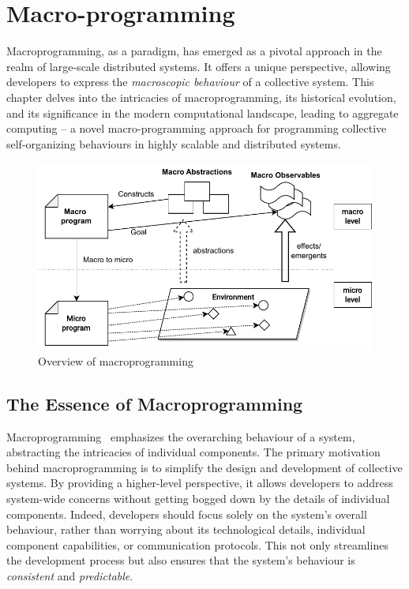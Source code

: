
\chapter{Macro-programming}\label{chap:macro-programming}%
\minitoc%
\newcommand{\q}[1]{\texttt{#1}}
Macroprogramming, as a paradigm, 
 has emerged as a pivotal approach in the realm of large-scale distributed systems. 
%
It offers a unique perspective, 
 allowing developers to express the \emph{macroscopic behaviour} of a collective system.
% 
This chapter delves into the intricacies of macroprogramming, 
 its historical evolution, and its significance in the modern computational landscape, 
 leading to aggregate computing -- a novel macro-programming approach for 
 programming collective self-organizing behaviours in highly scalable and distributed systems.

\begin{figure}
\includegraphics[width=\textwidth]{chapters/img/macroprogramming.drawio}
\caption{Overview of macroprogramming}\label{macro:fig:macro-programming}
\end{figure}
\section{The Essence of Macroprogramming}
Macroprogramming~\cite{casadei2023macroprogramming} emphasizes the overarching behaviour of a system, 
 abstracting the intricacies of individual components. 
%
The primary motivation behind macroprogramming 
 is to simplify the design and development of collective systems. 
 By providing a higher-level perspective, 
 it allows developers to address system-wide concerns without getting bogged down by the details of individual components. 
 Indeed, developers should focus solely on the system's overall behaviour, 
 rather than worrying about its technological details, 
 individual component capabilities, or communication protocols.
This not only streamlines the development process but also ensures that the system's behaviour is \emph{consistent} and \emph{predictable}.

